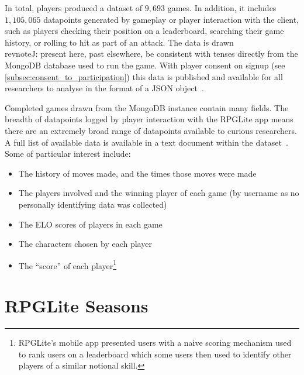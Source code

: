 In total, players produced a dataset of $9,693$ games. In addition, it includes
$1,105,065$ datapoints generated by gameplay or player interaction with the
client, such as players checking their position on a leaderboard, searching
their game history, or rolling to hit as part of an attack. The data is
drawn\\revnote{J: present here, past elsewhere, be consistent with tenses}
directly from the MongoDB database used to run the game. With player consent on
signup (see \cref{subsec:consent_to_participation}) this data is published and
available for all researchers to analyse in the format of a JSON
object~\cite{rpglite_dataset}.

Completed games drawn from the MongoDB instance contain many fields. The breadth
of datapoints logged by player interaction with the RPGLite app means there are
an extremely broad range of datapoints available to curious
researchers. A full
list of available data is available in a text document within the
dataset~\cite{rpglite_dataset}. Some of particular interest include:

\begin{itemize}
    \item The history of moves made, and the times those moves were
made
\item The players involved and the winning player of each game (by username as
no personally identifying data was collected)
\item The ELO scores of players in each game
\item The characters chosen by each player
\item The ``score'' of each player\footnote{RPGLite's mobile app presented users
with a naive scoring mechanism used to rank users on a leaderboard which some
users then used to identify other players of a similar notional skill.}
\end{itemize}



\section{RPGLite Seasons}
\label{seasons_of_rpglite}
\label{rpglite_configurations}

